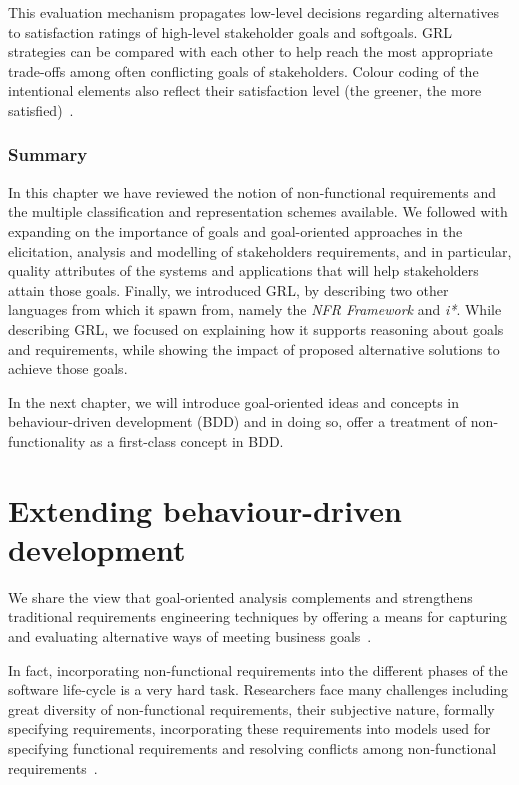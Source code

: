 \documentclass[dissertation,final]{softeng}
\newcommand{\nfrs}{non-functional requirements\xspace}
\begin{document}
This evaluation mechanism propagates low-level decisions regarding alternatives to satisfaction ratings of high-level stakeholder goals and softgoals. GRL strategies can be compared with each other to help reach the most appropriate trade-offs among often conflicting goals of stakeholders. Colour coding of the intentional elements also reflect their satisfaction level (the greener, the more satisfied)~\citep{amyot2011user}.

\subsection{Summary}

In this chapter we have reviewed the notion of non-functional requirements and the multiple classification and representation schemes available. We followed with expanding on the importance of goals and goal-oriented approaches in the elicitation, analysis and modelling of stakeholders requirements, and in particular, quality attributes of the systems and applications that will help stakeholders attain those goals. Finally, we introduced GRL, by describing two other languages from which it spawn from, namely the \emph{NFR Framework} and \emph{i*}. While describing GRL, we focused on explaining how it supports reasoning about goals and requirements, while showing the impact of proposed alternative solutions to achieve those goals.

In the next chapter, we will introduce goal-oriented ideas and concepts in behaviour-driven development (BDD) and in doing so, offer a treatment of non-functionality as a first-class concept in BDD.


\chapter{Extending behaviour-driven development}
\label{ch:Extendingbdd}
We share the view that goal-oriented analysis complements and strengthens traditional requirements engineering techniques by offering a means for capturing and evaluating alternative ways of meeting business goals~\citep{MylopoulosExpl2001}.

In fact, incorporating \nfrs into the different phases of the software life-cycle is a very hard task. Researchers face many challenges including great diversity of \nfrs, their subjective nature, formally specifying requirements, incorporating these requirements into models used for specifying functional requirements and resolving conflicts among \nfrs~\citep{Matoussi:2008wr}.
\end{document}
